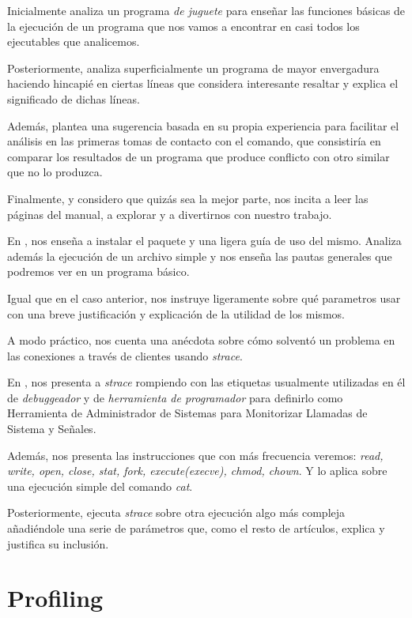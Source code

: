 \documentclass[paper=a4, fontsize=11pt]{scrartcl} %
\numberwithin{equation}{section} %
\numberwithin{figure}{section} %
\numberwithin{table}{section} %
\begin{document}
\begin{enumerate}
		Inicialmente analiza un programa \textit{de juguete} para enseñar las funciones básicas de la
		ejecución de un programa que nos vamos a encontrar en casi todos los ejecutables que analicemos.
		
		Posteriormente, analiza superficialmente un programa de mayor envergadura haciendo hincapié en
		ciertas líneas que considera interesante resaltar y explica el significado de dichas líneas.
		
		Además, plantea una sugerencia basada en su propia experiencia para facilitar el análisis en las
		primeras tomas de contacto con el comando, que consistiría en comparar los resultados de un
		programa que produce conflicto con otro similar que no lo produzca.
		
		Finalmente, y considero que quizás sea la mejor parte, nos incita a leer las páginas del manual,
		a explorar y a divertirnos con nuestro trabajo.
		
		En \cite{strace2}, nos enseña a instalar el paquete y una ligera guía de uso del mismo. Analiza
		además la ejecución de un archivo simple y nos enseña las pautas generales que podremos ver en
		un programa básico.
		
		Igual que en el caso anterior, nos instruye ligeramente sobre qué parametros usar con una breve
		justificación y explicación de la utilidad de los mismos.
		
		A modo práctico, nos cuenta una anécdota sobre cómo solventó un problema en las conexiones a
		través de clientes usando \textit{strace}.
		
		En \cite{strace3}, nos presenta a \textit{strace} rompiendo con las etiquetas usualmente
		utilizadas en él de \textit{debuggeador} y de \textit{herramienta de programador} para
		definirlo como \textsf{Herramienta de Administrador de Sistemas para Monitorizar Llamadas de
		Sistema y Señales}.
		
		Además, nos presenta las instrucciones que con más frecuencia veremos: \textit{read, write,
		open, close, stat, fork, execute(execve), chmod, chown}. Y lo aplica sobre una ejecución simple
		del comando \textit{cat}\cite{man_cat}.
		
		Posteriormente, ejecuta \textit{strace} sobre otra ejecución algo más compleja añadiéndole una
		serie de parámetros que, como el resto de artículos, explica y justifica su inclusión.
		
	\section{Profiling}

\end{enumerate}
\end{document}
